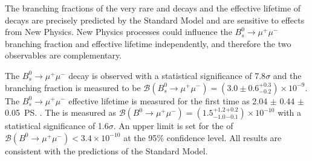 \begin{titlepage}
The branching fractions of the very rare \bdmumu and \bsmumu decays and the effective lifetime of \bsmumu decays are precisely predicted by the Standard Model and are sensitive to effects from New Physics.
New Physics processes could influence the $B_{s}^{0} \to \mu^{+} \mu^{-}$  branching fraction and effective lifetime independently, and therefore the two observables are complementary. %




The $B_{s}^{0} \to \mu^{+} \mu^{-}$ decay is observed with a statistical significance of 7.8$\sigma$ and the branching fraction is measured to be $\mathcal{B}(B_{s}^{0} \to \mu^{+} \mu^{-}) = (3.0 \pm 0.6^{ +0.3}_{ -0.2}) \times 10^{-9}$. The $B_{s}^{0} \to \mu^{+} \mu^{-}$ effective lifetime is measured for the first time as 2.04 $\pm$ 0.44 $\pm$ 0.05~\ps.
The \bdmumu \BF is measured as $\mathcal{B}(B^{0} \to \mu^{+} \mu^{-}) = (1.5^{+1.2}_{-1.0}^{+0.2}_{-0.1})\times 10^{-10}$ with a statistical significance of 1.6$\sigma$. An upper limit is set for the \BF of $\mathcal{B}(B^{0} \to \mu^{+} \mu^{-})< 3.4 \times 10^{-10}$ at the 95$\%$ confidence level. All results are consistent with the predictions of the Standard Model.                                                   





\\
\end{titlepage}
